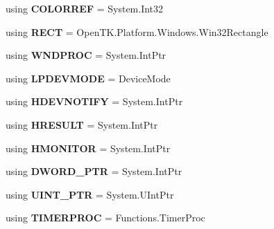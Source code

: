 \begin{DoxyCompactItemize}
\item 
\hypertarget{namespace_open_t_k_1_1_platform_1_1_windows_a6ff503f7c62dc7f217941678c230a5a2}{using {\bfseries C\-O\-L\-O\-R\-R\-E\-F} = System.\-Int32}\label{namespace_open_t_k_1_1_platform_1_1_windows_a6ff503f7c62dc7f217941678c230a5a2}

\item 
\hypertarget{namespace_open_t_k_1_1_platform_1_1_windows_a7573dbe0b6ce7e1d2fb1f57cba08475f}{using {\bfseries R\-E\-C\-T} = Open\-T\-K.\-Platform.\-Windows.\-Win32\-Rectangle}\label{namespace_open_t_k_1_1_platform_1_1_windows_a7573dbe0b6ce7e1d2fb1f57cba08475f}

\item 
\hypertarget{namespace_open_t_k_1_1_platform_1_1_windows_a1b27ef7709f1c33384ccfb3fa7a03c1d}{using {\bfseries W\-N\-D\-P\-R\-O\-C} = System.\-Int\-Ptr}\label{namespace_open_t_k_1_1_platform_1_1_windows_a1b27ef7709f1c33384ccfb3fa7a03c1d}

\item 
\hypertarget{namespace_open_t_k_1_1_platform_1_1_windows_ad4cc99d5cf8cfae313c3c831a94a2e8f}{using {\bfseries L\-P\-D\-E\-V\-M\-O\-D\-E} = Device\-Mode}\label{namespace_open_t_k_1_1_platform_1_1_windows_ad4cc99d5cf8cfae313c3c831a94a2e8f}

\item 
\hypertarget{namespace_open_t_k_1_1_platform_1_1_windows_aa058399df41f1eefe2e34aa84f4c3b99}{using {\bfseries H\-D\-E\-V\-N\-O\-T\-I\-F\-Y} = System.\-Int\-Ptr}\label{namespace_open_t_k_1_1_platform_1_1_windows_aa058399df41f1eefe2e34aa84f4c3b99}

\item 
\hypertarget{namespace_open_t_k_1_1_platform_1_1_windows_a4996b64f13c8f5db7ff03b5f837688d0}{using {\bfseries H\-R\-E\-S\-U\-L\-T} = System.\-Int\-Ptr}\label{namespace_open_t_k_1_1_platform_1_1_windows_a4996b64f13c8f5db7ff03b5f837688d0}

\item 
\hypertarget{namespace_open_t_k_1_1_platform_1_1_windows_aeaa0cfa0cfc9931a5fb449abbf9defca}{using {\bfseries H\-M\-O\-N\-I\-T\-O\-R} = System.\-Int\-Ptr}\label{namespace_open_t_k_1_1_platform_1_1_windows_aeaa0cfa0cfc9931a5fb449abbf9defca}

\item 
\hypertarget{namespace_open_t_k_1_1_platform_1_1_windows_ac2e87c747798b8faf7cb553ef7abf949}{using {\bfseries D\-W\-O\-R\-D\-\_\-\-P\-T\-R} = System.\-Int\-Ptr}\label{namespace_open_t_k_1_1_platform_1_1_windows_ac2e87c747798b8faf7cb553ef7abf949}

\item 
\hypertarget{namespace_open_t_k_1_1_platform_1_1_windows_a010ca87163dfb6022bccb382b4966ee7}{using {\bfseries U\-I\-N\-T\-\_\-\-P\-T\-R} = System.\-U\-Int\-Ptr}\label{namespace_open_t_k_1_1_platform_1_1_windows_a010ca87163dfb6022bccb382b4966ee7}

\item 
\hypertarget{namespace_open_t_k_1_1_platform_1_1_windows_a8d1247a06d9b9d5d53d836c97b5c10c6}{using {\bfseries T\-I\-M\-E\-R\-P\-R\-O\-C} = Functions.\-Timer\-Proc}\label{namespace_open_t_k_1_1_platform_1_1_windows_a8d1247a06d9b9d5d53d836c97b5c10c6}

\end{DoxyCompactItemize}
